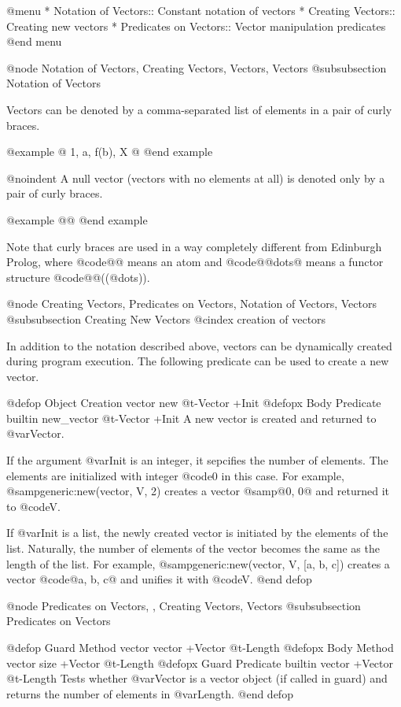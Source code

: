 {{@menu
* Notation of Vectors::         Constant notation of vectors
* Creating Vectors::            Creating new vectors
* Predicates on Vectors::       Vector manipulation predicates
@end menu

@node Notation of Vectors, Creating Vectors, Vectors, Vectors
@subsubsection Notation of Vectors

Vectors can be denoted by a comma-separated list of elements in a pair
of curly braces.

@example
@{ 1, a, f(b), X @}
@end example

@noindent
A null vector (vectors with no elements at all) is denoted only by a
pair of curly braces.

@example
@{@}
@end example

Note that curly braces are used in a way completely different from
Edinburgh Prolog, where @code{@{@}} means an atom and @code{@{@dots{}@}}
means a functor structure @code{@{@}((@dots{}))}.

@node Creating Vectors, Predicates on Vectors, Notation of Vectors, Vectors
@subsubsection Creating New Vectors
@cindex creation of vectors

In addition to the notation described above, vectors can be dynamically
created during program execution.  The following predicate can be used
to create a new vector.

@defop {Object Creation} vector new @t{-}Vector +Init
@defopx {Body Predicate} {builtin} new_vector @t{-}Vector +Init
A new vector is created and returned to @var{Vector}.

If the argument @var{Init} is an integer, it sepcifies the number of
elements.  The elements are initialized with integer @code{0} in this
case.  For example, @samp{generic:new(vector, V, 2)} creates a vector
@samp{@{0, 0@}} and returned it to @code{V}.

If @var{Init} is a list, the newly created vector is initiated by the
elements of the list.  Naturally, the number of elements of the vector
becomes the same as the length of the list.  For example,
@samp{generic:new(vector, V, [a, b, c])} creates a vector @code{@{a, b,
c@}} and unifies it with @code{V}.
@end defop

@node Predicates on Vectors,  , Creating Vectors, Vectors
@subsubsection Predicates on Vectors

@defop {Guard Method} vector vector +Vector @t{-}Length
@defopx {Body Method} vector size +Vector @t{-}Length
@defopx {Guard Predicate} {builtin} vector +Vector @t{-}Length
Tests whether @var{Vector} is a vector object (if called in guard) and
returns the number of elements in @var{Length}.
@end defop

}}
